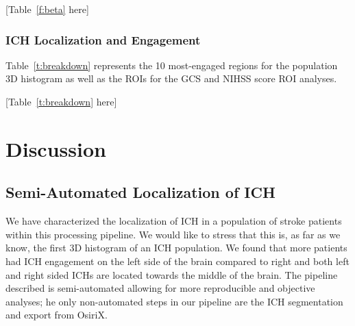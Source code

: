 \documentclass[10pt]{article}\usepackage[]{graphicx}\usepackage[]{color}
\begin{document}
[Table~\ref{f:beta} here]








\subsubsection*{ICH Localization and Engagement}

Table~\ref{t:breakdown} represents the 10 most-engaged regions for the population 3D histogram as well as the ROIs for the GCS and NIHSS score ROI analyses.  

[Table~\ref{t:breakdown} here]


\section*{Discussion}


\subsection*{Semi-Automated Localization of ICH}

We have characterized the localization of ICH in a population of stroke patients within this processing pipeline.  We would like to stress that this is, as far as we know, the first 3D histogram of an ICH population.  We found that more patients had ICH engagement on the left side of the brain compared to right and both left and right sided ICHs are located towards the middle of the brain.  
The pipeline described is semi-automated allowing for more reproducible and objective analyses; he only non-automated steps in our pipeline are the ICH segmentation and export from OsiriX.  
\end{document}
